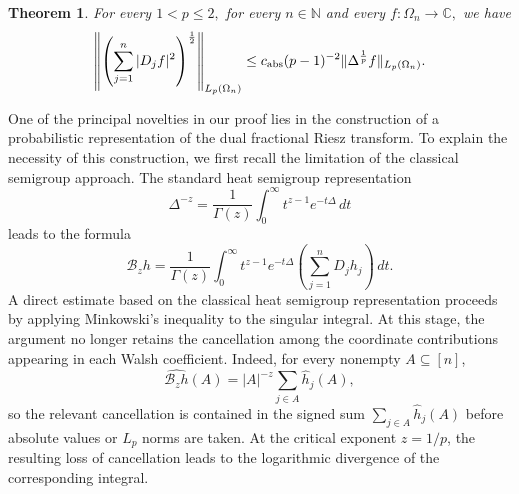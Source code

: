\documentclass{amsart}
\newcommand{\N}{\mathbb N}
\numberwithin{equation}{section}
\newtheorem{thm}{Theorem}[section]
\theoremstyle{definition}
\theoremstyle{remark}
\newcommand{\1}{\mathbf 1}
\begin{document}
\begin{thm}\label{thm:main}
For every $1<p\leq 2,$ for every
$n\in\N$ and every $f:\Omega_n\to\mathbb{C},$ we have
\[
\left\|\left(\sum_{j=1}^n|D_jf|^2\right)^{\frac12}\right\|_{L_p(\Omega_n)} \leq c_{{\rm abs}}(p-1)^{-2}\|\Delta^{\frac1p}f\|_{L_p(\Omega_n)}.
\]
\end{thm}

One of the principal novelties in our proof lies in the construction of a probabilistic representation of the dual fractional Riesz transform.  To explain the necessity of this construction, we first recall the limitation of the classical semigroup approach.  The standard heat semigroup representation
\[
\Delta^{-z}=\frac{1}{\Gamma(z)}\int_{0}^{\infty}t^{z-1}e^{-t\Delta}\,dt
\]
leads to the formula
\[
\mathcal B_z h=\frac{1}{\Gamma(z)}\int_{0}^{\infty}t^{z-1}e^{-t\Delta}\left(\sum_{j=1}^{n}D_jh_j\right)\,dt .
\]
A direct estimate based on the classical heat semigroup representation
proceeds by applying Minkowski's inequality to the singular integral.
At this stage, the argument no longer retains the cancellation among the
coordinate contributions appearing in each Walsh coefficient. Indeed, for
every nonempty $A\subseteq[n]$,
\[
\widehat{\mathcal B_{z}h}(A)
=
|A|^{-z}\sum_{j\in A}\widehat h_{j}(A),
\]
so the relevant cancellation is contained in the signed sum $\sum_{j\in A}\widehat h_{j}(A)$ before absolute values or $L_{p}$ norms are taken. At the critical exponent $z=1/p$, the resulting loss of
cancellation leads to the logarithmic divergence of the corresponding
integral. 
\end{document}
